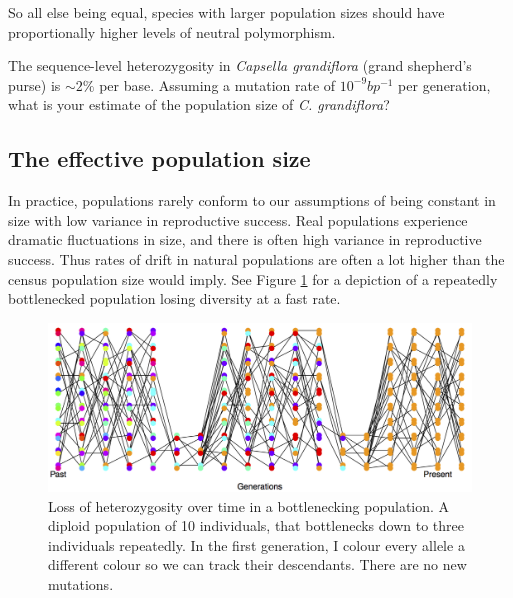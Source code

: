 So all else being equal, species with larger population sizes should
have proportionally higher levels of neutral polymorphism.  

\begin{question}
The sequence-level heterozygosity in {\it Capsella grandiflora} (grand shepherd's purse) is $\sim 2\%$ per base. Assuming a mutation rate of $10^{-9} bp^{-1}$ per generation, what is your estimate of the population size of {\it C. grandiflora}?  
\end{question}

\subsection{The effective population size}

In practice, populations rarely conform to our assumptions of being constant in size with low variance in reproductive success. Real populations experience dramatic fluctuations in size, and there is
often high variance in reproductive success. Thus rates of drift in
natural populations are often a lot higher than the census population
size would imply. See Figure \ref{fig:LossHet_varying_pop}  for a depiction of
a repeatedly bottlenecked population losing diversity at a fast rate.

\begin{figure}
\begin{center}
\includegraphics[width= \textwidth]{figures/Loss_of_he_col_alleles_varying_pop_dark.png}
\end{center}
\caption{Loss of heterozygosity over time in a bottlenecking population. A diploid population of 10 individuals, that bottlenecks
  down to three individuals repeatedly. In the first generation, I colour every allele a different
colour so we can track their descendants. There are no new
  mutations.} \label{fig:LossHet_varying_pop}  
\end{figure} 


